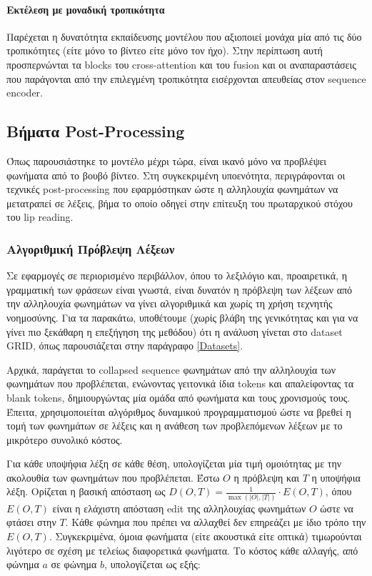 \paragraph{Εκτέλεση με μοναδική τροπικότητα}
\label{SingleModality}
Παρέχεται η δυνατότητα εκπαίδευσης μοντέλου που αξιοποιεί μονάχα μία από τις δύο τροπικότητες (είτε μόνο το βίντεο είτε μόνο τον ήχο). Στην περίπτωση αυτή προσπερνώνται τα blocks του cross-attention και του fusion και οι αναπαραστάσεις που παράγονται από την επιλεγμένη τροπικότητα εισέρχονται απευθείας στον sequence encoder.

\subsection{Βήματα Post-Processing}
\label{PostProcessing}

Όπως παρουσιάστηκε το μοντέλο μέχρι τώρα, είναι ικανό μόνο να προβλέψει φωνήματα από το βουβό βίντεο. Στη συγκεκριμένη υποενότητα, περιγράφονται οι τεχνικές post-processing που εφαρμόστηκαν ώστε η αλληλουχία φωνημάτων να μετατραπεί σε λέξεις, βήμα το οποίο οδηγεί στην επίτευξη του πρωταρχικού στόχου του lip reading.

\subsubsection{Αλγοριθμική Πρόβλεψη Λέξεων}
\label{WordPrediction}

Σε εφαρμογές σε περιορισμένο περιβάλλον, όπου το λεξιλόγιο και, προαιρετικά, η γραμματική των φράσεων είναι γνωστά, είναι δυνατόν η πρόβλεψη των λέξεων από την αλληλουχία φωνημάτων να γίνει αλγοριθμικά και χωρίς τη χρήση τεχνητής νοημοσύνης. Για τα παρακάτω, υποθέτουμε (χωρίς βλάβη της γενικότητας και για να γίνει πιο ξεκάθαρη η επεξήγηση της μεθόδου) ότι η ανάλυση γίνεται στο dataset GRID, όπως παρουσιάζεται στην παράγραφο \ref{Datasets}.

Αρχικά, παράγεται το collapsed sequence φωνημάτων από την αλληλουχία των φωνημάτων που προβλέπεται, ενώνοντας γειτονικά ίδια tokens και απαλείφοντας τα blank tokens, δημιουργώντας μία ομάδα από φωνήματα και τους χρονισμούς τους. Έπειτα, χρησιμοποιείται αλγόριθμος δυναμικού προγραμματισμού ώστε να βρεθεί η τομή των φωνημάτων σε λέξεις και η ανάθεση των προβλεπόμενων λέξεων με το μικρότερο συνολικό κόστος. 

Για κάθε υποψήφια λέξη σε κάθε θέση, υπολογίζεται μία τιμή ομοιότητας με την ακολουθία των φωνημάτων που προβλέπεται. Έστω $O$ η πρόβλεψη και $T$ η υποψήφια λέξη. Ορίζεται η βασική απόσταση ως $D(O,T) = \frac{1}{\max(|O|, |T|)} \cdot E(O,T)$, όπου $E(O,T)$ είναι η ελάχιστη απόσταση edit της αλληλουχίας φωνημάτων $O$ ώστε να φτάσει στην $T$. Κάθε φώνημα που πρέπει να αλλαχθεί δεν επηρεάζει με ίδιο τρόπο την $E(O,T)$. Συγκεκριμένα, όμοια φωνήματα (είτε ακουστικά είτε οπτικά) τιμωρούνται λιγότερο σε σχέση με τελείως διαφορετικά φωνήματα. Το κόστος κάθε αλλαγής, από φώνημα $a$ σε φώνημα $b$, υπολογίζεται ως εξής:

